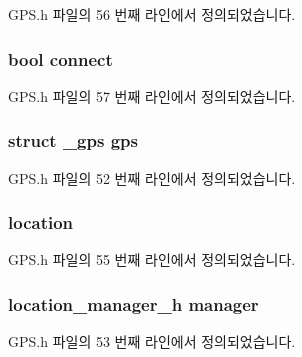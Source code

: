 G\-P\-S.\-h 파일의 56 번째 라인에서 정의되었습니다.

\hypertarget{struct_g_p_s_extends_af4e68d5926444b7651a9095ee0b26e48}{
\subsubsection[{connect}]{\setlength{\rightskip}{0pt plus 5cm}bool connect}}\label{struct_g_p_s_extends_af4e68d5926444b7651a9095ee0b26e48}


G\-P\-S.\-h 파일의 57 번째 라인에서 정의되었습니다.

\hypertarget{struct_g_p_s_extends_ab3ecc8b2ec37f482acf1ac0c1a3d5e4e}{
\subsubsection[{gps}]{\setlength{\rightskip}{0pt plus 5cm}struct {\bf \-\_\-gps} gps}}\label{struct_g_p_s_extends_ab3ecc8b2ec37f482acf1ac0c1a3d5e4e}


G\-P\-S.\-h 파일의 52 번째 라인에서 정의되었습니다.

\hypertarget{struct_g_p_s_extends_a260defa82d536dcea2aa22452b862110}{
\subsubsection[{location}]{ location}}\label{struct_g_p_s_extends_a260defa82d536dcea2aa22452b862110}


G\-P\-S.\-h 파일의 55 번째 라인에서 정의되었습니다.

\hypertarget{struct_g_p_s_extends_a3454051e15c896bc1d5271d43c810958}{
\subsubsection[{manager}]{\setlength{\rightskip}{0pt plus 5cm}location\-\_\-manager\-\_\-h manager}}\label{struct_g_p_s_extends_a3454051e15c896bc1d5271d43c810958}


G\-P\-S.\-h 파일의 53 번째 라인에서 정의되었습니다.

